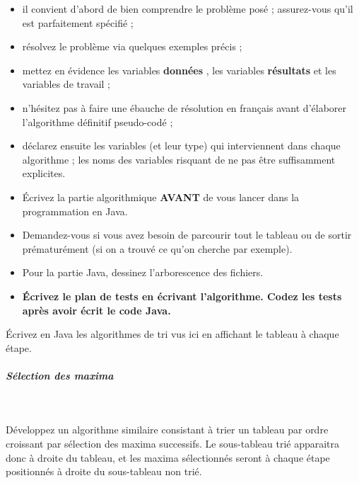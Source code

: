 \documentclass[11pt,a4paper]{article}
\begin{document}
					\begin{itemize}
				
			\item il convient d'abord de bien comprendre le probl\`eme pos\'e ; assurez-vous qu'il est parfaitement sp\'ecifi\'e ;
			\item r\'esolvez le probl\`eme via quelques exemples pr\'ecis ;
			\item mettez en \'evidence les variables \textbf{\guillemotleft  donn\'ees \guillemotright }, les variables \textbf{\guillemotleft  r\'esultats \guillemotright } et les variables de travail ;
			\item n'h\'esitez pas \`a faire une \'ebauche de r\'esolution en fran\c cais avant d'\'elaborer l'algorithme d\'efinitif pseudo-cod\'e ;
			\item d\'eclarez ensuite les variables (et leur type) qui interviennent dans chaque algorithme ; les noms des variables risquant de ne pas \^etre suffisamment explicites.
			\item \'Ecrivez la partie algorithmique \textbf{AVANT} de vous lancer dans la programmation en Java.
			\item Demandez-vous si vous avez besoin de parcourir tout le tableau ou de sortir pr\'ematur\'ement (si on a trouv\'e ce qu'on cherche par exemple).
			\item Pour la partie Java, dessinez l'arborescence des fichiers. 
			\item \textbf{\'Ecrivez le plan de tests en \'ecrivant l'algorithme. Codez les tests apr\`es avoir \'ecrit le code Java.}
					\end{itemize}
				
            \par
        
        \'Ecrivez en Java les algorithmes de tri vus ici en affichant le tableau \`a chaque \'etape.
      
            \par
        
			
		\subparagraph{S\'election des maxima} 
		
					\textcolor{white}{.} \par
				
        D\'eveloppez un algorithme similaire consistant \`a trier un tableau par ordre croissant par
        s\'election des maxima successifs. Le sous-tableau tri\'e apparaitra donc \`a droite du tableau,
        et les maxima s\'electionn\'es seront \`a chaque \'etape positionn\'es \`a droite du sous-tableau non tri\'e.
      
\end{document}
